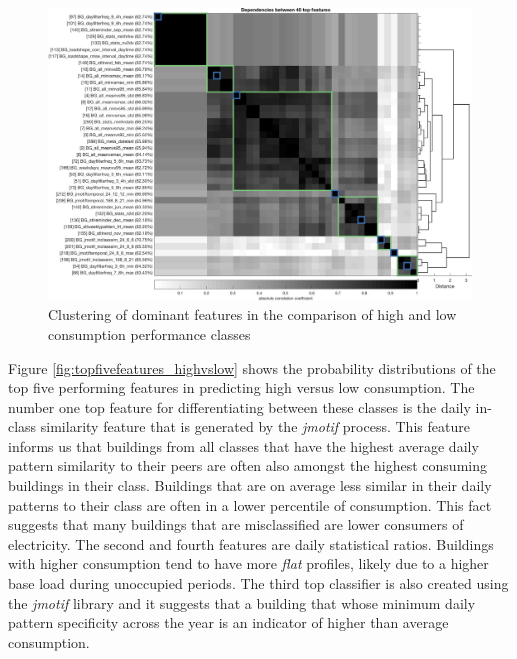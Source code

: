 \begin{figure}[ht!]
\begin{center}
\includegraphics[width=1\columnwidth]{figures/Output_HighvsLow_Top40/Output_HighvsLow_Top40}
\caption{{Clustering of dominant features in the comparison of high and low consumption performance classes
\label{fig:featurecluserting_performanceclass}%
}}
\end{center}
\end{figure}

Figure \ref{fig:topfivefeatures_highvslow} shows the probability distributions of the top five performing features in predicting high versus low consumption. The number one top feature for differentiating between these classes is the daily in-class similarity feature that is generated by the \emph{jmotif} process. This feature informs us that buildings from all classes that have the highest average daily pattern similarity to their peers are often also amongst the highest consuming buildings in their class. Buildings that are on average less similar in their daily patterns to their class are often in a lower percentile of consumption. This fact suggests that many buildings that are misclassified are lower consumers of electricity. The second and fourth features are daily statistical ratios. Buildings with higher consumption tend to have more \emph{flat} profiles, likely due to a higher base load during unoccupied periods. The third top classifier is also created using the \emph{jmotif} library and it suggests that a building that whose minimum daily pattern specificity across the year is an indicator of higher than average consumption. 


